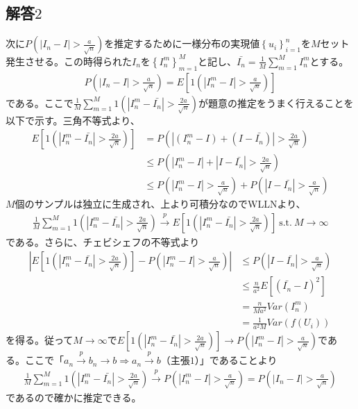 \documentclass{article}
\begin{document}
\subsection{解答$2$}
次に$P\left( | I_n - I | > \frac{a}{\sqrt{n}} \right)$を推定するために一様分布の実現値$\left\{ u_i \right\}_{i=1}^n$を$M$セット発生させる。この時得られた$I_n$を$\left\{I_n^m\right\}_{m=1}^M$と記し、$\bar{I_n} = \frac{1}{M} \sum_{m=1}^M I_n^m$とする。
\begin{align*}
	P\left( | I_n - I | > \frac{a}{\sqrt{n}} \right) = E\left[ 1\left(  | I_n^m - I | > \frac{a}{\sqrt{n}} \right) \right]
\end{align*}
である。ここで$\frac{1}{M} \sum_{m=1}^M 1\left(  | I_n^m - \bar{I_n} | > \frac{2a}{\sqrt{n}} \right)$が題意の推定をうまく行えることを以下で示す。三角不等式より、
\begin{align*}
	E\left[ 1\left(  | I_n^m - \bar{I_n} | > \frac{2a}{\sqrt{n}} \right) \right] &= P\left( | (I_n^m - I) + (I - \bar{I_n}) |  > \frac{2a}{\sqrt{n}} \right) \\
	&\leq P\left( | I_n^m - I |+ |I - \bar{I_n}|  > \frac{2a}{\sqrt{n}} \right)\\
	& \leq P\left( | I_n^m - I |> \frac{a}{\sqrt{n}} \right) + P\left( |I - \bar{I_n}|  > \frac{a}{\sqrt{n}} \right)
\end{align*}
$M$個のサンプルは独立に生成され、上より可積分なのでWLLNより、
\begin{align*}
\frac{1}{M} \sum_{m=1}^M 1\left(  | I_n^m - \bar{I_n} | > \frac{2a}{\sqrt{n}} \right) \xrightarrow{p} E\left[ 1\left(  | I_n^m - \bar{I_n} | > \frac{2a}{\sqrt{n}} \right) \right]\ \text{s.t.}\ M\to \infty
\end{align*}
である。さらに、チェビシェフの不等式より
\begin{align*}
	\left| E\left[ 1\left(  | I_n^m - \bar{I_n} | > \frac{2a}{\sqrt{n}} \right) \right] - P\left( | I_n^m - I |> \frac{a}{\sqrt{n}} \right)  \right| &\leq P\left( |I - \bar{I_n}|  > \frac{a}{\sqrt{n}} \right)\\
	&\leq \frac{n}{a^2} E\left[ \left( \bar{I_n} - I \right)^2 \right]\\
	&= \frac{n}{Ma^2} Var\left(I_n^m \right)\\
	&= \frac{1}{a^2M} Var\left( f(U_i) \right)
\end{align*}
を得る。従って$M\to \infty$で$E\left[ 1\left(  | I_n^m - \bar{I_n} | > \frac{2a}{\sqrt{n}} \right) \right] \to P\left( | I_n^m - I |> \frac{a}{\sqrt{n}} \right)$である。ここで「$a_n \xrightarrow{p} b_n \to b \Rightarrow a_n \xrightarrow{p} b$（主張$1$）」であることより
\begin{align*}
	\frac{1}{M} \sum_{m=1}^M 1\left(  | I_n^m - \bar{I_n} | > \frac{2a}{\sqrt{n}} \right) \xrightarrow{p} P\left( | I_n^m - I |> \frac{a}{\sqrt{n}} \right) = P\left( | I_n - I |> \frac{a}{\sqrt{n}} \right)
\end{align*}
であるので確かに推定できる。
\end{document}
